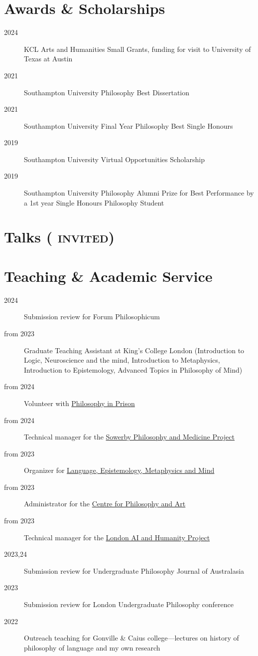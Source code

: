 \documentclass{cv}
\begin{document}
\section*{Awards \& Scholarships}
\begin{description}
\item[{2024}] KCL Arts and Humanities Small Grants, funding for visit to
University of Texas at Austin
\item[{2021}] Southampton University Philosophy Best Dissertation
\item[{2021}] Southampton University Final Year Philosophy Best Single
Honours
\item[{2019}] Southampton University Virtual Opportunities Scholarship
\item[{2019}] Southampton University Philosophy Alumni Prize for Best
Performance by a 1st year Single Honours Philosophy Student
\end{description}

\section*{Talks \textsc{\textnormal{\normalsize{(\invited{} invited)}}}}
\printbibliography[check=Presentation]{}

\section*{Teaching \& Academic Service}
\begin{description}
\item[{2024}] Submission review for Forum Philosophicum
\item[{from 2023}] Graduate Teaching Assistant at King's College London
(Introduction to Logic, Neuroscience and the mind, Introduction to
Metaphysics, Introduction to Epistemology, Advanced Topics in
Philosophy of Mind)
\item[{from 2024}] Volunteer with \href{https://www.philosophyinprison.com/}{Philosophy in Prison}
\item[{from 2024}] Technical manager for the \href{https://www.philosophyandmedicine.org/}{Sowerby Philosophy and
Medicine Project}
\item[{from 2023}] Organizer for \href{https://www.lemm-london.co.uk/}{Language, Epistemology, Metaphysics and Mind}
\item[{from 2023}] Administrator for the \href{https://philosophyarts.co.uk/}{Centre for Philosophy and Art}
\item[{from 2023}] Technical manager for the \href{https://www.ai-humanity-london.com/}{London AI and Humanity Project}
\item[{2023,24}] Submission review for Undergraduate Philosophy Journal of
Australasia
\item[{2023}] Submission review for London Undergraduate Philosophy
conference
\item[{2022}] Outreach teaching for Gonville \& Caius college---lectures on
history of philosophy of language and my own research
\end{description}
\end{document}
